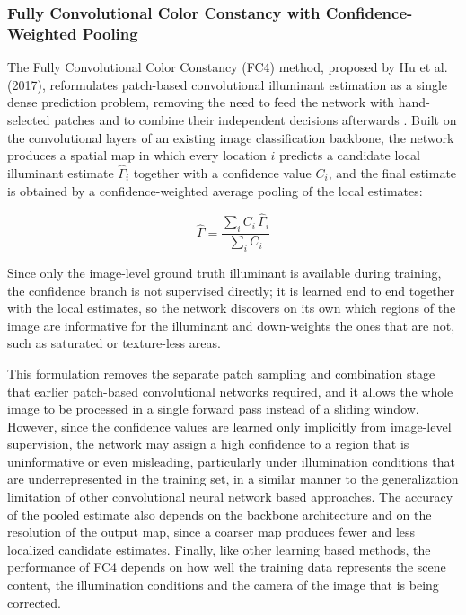 \subsubsection{Fully Convolutional Color Constancy with Confidence-Weighted Pooling}
The Fully Convolutional Color Constancy (FC4) method, proposed by Hu et al. (2017), reformulates patch-based convolutional illuminant estimation as a single dense prediction problem, removing the need to feed the network with hand-selected patches and to combine their independent decisions afterwards \cite{hu2017fc4}. Built on the convolutional layers of an existing image classification backbone, the network produces a spatial map in which every location $i$ predicts a candidate local illuminant estimate $\hat{\Gamma}_i$ together with a confidence value $C_i$, and the final estimate is obtained by a confidence-weighted average pooling of the local estimates:

\begin{equation}
\hat{\Gamma} = \frac{\sum_{i} C_i \, \hat{\Gamma}_i}{\sum_{i} C_i}
\end{equation}

Since only the image-level ground truth illuminant is available during training, the confidence branch is not supervised directly; it is learned end to end together with the local estimates, so the network discovers on its own which regions of the image are informative for the illuminant and down-weights the ones that are not, such as saturated or texture-less areas.

This formulation removes the separate patch sampling and combination stage that earlier patch-based convolutional networks required, and it allows the whole image to be processed in a single forward pass instead of a sliding window. However, since the confidence values are learned only implicitly from image-level supervision, the network may assign a high confidence to a region that is uninformative or even misleading, particularly under illumination conditions that are underrepresented in the training set, in a similar manner to the generalization limitation of other convolutional neural network based approaches. The accuracy of the pooled estimate also depends on the backbone architecture and on the resolution of the output map, since a coarser map produces fewer and less localized candidate estimates. Finally, like other learning based methods, the performance of FC4 depends on how well the training data represents the scene content, the illumination conditions and the camera of the image that is being corrected.

